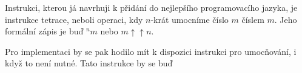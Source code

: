 \documentclass{fkssolpub}
\author{Ondřej Sedláček}
\begin{document}
 

Instrukci, kterou já navrhuji k přidání do nejlepšího programovacího jazyka, je instrukce
tetrace, neboli operaci, kdy $n$-krát umocníme číslo $m$ číslem $m$. Jeho formální zápis
je buď $^n m$ nebo $m \uparrow \uparrow n$. 

Pro implementaci by se pak hodilo mít k dispozici instrukci pro umocňování, i když
to není nutné. Tato instrukce by se buď
\end{document}
